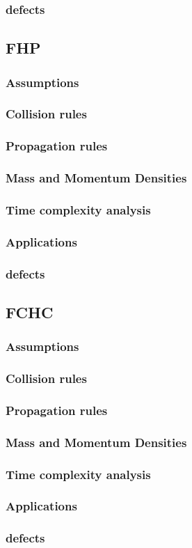 \documentclass[twocolumn,a4paper,10pt]{article}
\begin{document}
\subsubsection{defects}
\subsection{FHP}
\subsubsection{Assumptions}
\subsubsection{Collision rules}
\subsubsection{Propagation rules}
\subsubsection{Mass and Momentum Densities}
\subsubsection{Time complexity analysis}
\subsubsection{Applications}
\subsubsection{defects}
\subsection{FCHC}
\subsubsection{Assumptions}
\subsubsection{Collision rules}
\subsubsection{Propagation rules}
\subsubsection{Mass and Momentum Densities}
\subsubsection{Time complexity analysis}
\subsubsection{Applications}
\subsubsection{defects}
\end{document}
